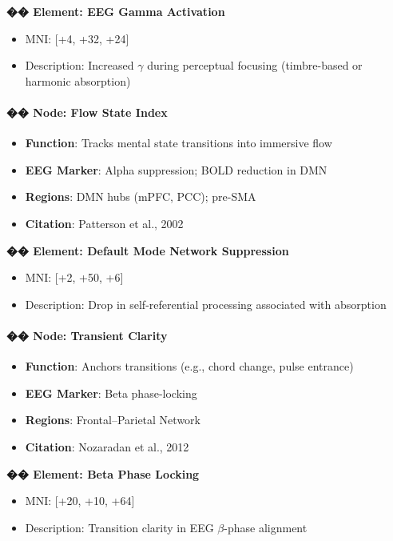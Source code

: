 \documentclass[10pt]{article}
\begin{document}
\textbf{�� Element: EEG Gamma Activation}

\begin{itemize}
    \item MNI: [+4, +32, +24]
    \item Description: Increased $\gamma$ during perceptual focusing (timbre-based or harmonic absorption)
\end{itemize}

\paragraph{�� Node: Flow State Index}

\begin{itemize}
    \item \textbf{Function}: Tracks mental state transitions into immersive flow
    \item \textbf{EEG Marker}: Alpha suppression; BOLD reduction in DMN
    \item \textbf{Regions}: DMN hubs (mPFC, PCC); pre-SMA
    \item \textbf{Citation}: Patterson et al., 2002
\end{itemize}

\textbf{�� Element: Default Mode Network Suppression}

\begin{itemize}
    \item MNI: [+2, +50, +6]
    \item Description: Drop in self-referential processing associated with absorption
\end{itemize}

\paragraph{�� Node: Transient Clarity}

\begin{itemize}
    \item \textbf{Function}: Anchors transitions (e.g., chord change, pulse entrance)
    \item \textbf{EEG Marker}: Beta phase-locking
    \item \textbf{Regions}: Frontal–Parietal Network
    \item \textbf{Citation}: Nozaradan et al., 2012
\end{itemize}

\textbf{�� Element: Beta Phase Locking}

\begin{itemize}
    \item MNI: [+20, +10, +64]
    \item Description: Transition clarity in EEG $\beta$-phase alignment
\end{itemize}
\end{document}
